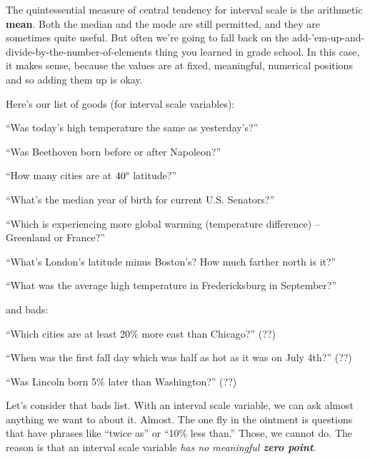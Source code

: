 The quintessential measure of central tendency for interval scale is the
arithmetic \textbf{mean}. Both the median and the mode are still permitted, and
they are sometimes quite useful. But often we're going to fall back on the
add-'em-up-and-divide-by-the-number-of-elements thing you learned in grade
school. In this case, it makes sense, because the values are at fixed,
meaningful, numerical positions and so adding them up is okay.

Here's our list of goods (for interval scale variables):

\begin{compactitem}
\item[\leftthumbsup] ``Was today's high temperature the same as yesterday's?''
\item[\leftthumbsup] ``Was Beethoven born before or after Napoleon?''
\item[\leftthumbsup] ``How many cities are at $40\degree$ latitude?''
\item[\leftthumbsup] ``What's the median year of birth for current U.S. Senators?''
\item[\leftthumbsup] ``Which is experiencing more global warming
(temperature difference) -- Greenland or France?''
\item[\leftthumbsup] ``What's London's latitude minus Boston's? How much
farther north is it?''
\item[\leftthumbsup] ``What was the average high temperature in Fredericksburg
in September?''
\end{compactitem}

and bads:

\begin{compactitem}
\item[\leftthumbsdown] ``Which cities are at least 20\% more east than
Chicago?'' (??)
\item[\leftthumbsdown] ``When was the first fall day which was half as hot as
it was on July 4th?'' (??)
\item[\leftthumbsdown] ``Was Lincoln born 5\% later than Washington?'' (??)
\end{compactitem}

Let's consider that bads list. With an interval scale variable, we can ask
almost anything we want to about it. Almost. The one fly in the ointment is
questions that have phrases like ``twice as'' or ``10\% less than.'' Those, we
cannot do. The reason is that an interval scale variable \textit{has no
meaningful \textbf{zero point}}.

